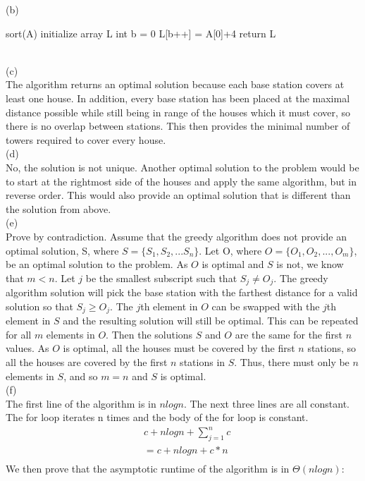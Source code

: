\documentclass{assignment}
\begin{document}
\begin{problemlist}
\begin{answer}
(b)
\begin {algorithm}
sort(A)\;
initialize array L\;
int b = 0\;
L[b++] = A[0]+4\;
return L\;
\end {algorithm}\\
(c)\\
 The algorithm returns an optimal solution because each base station covers at least one house. In addition, every base station has been placed at the maximal distance possible while still being in range of the houses which it must cover, so there is no overlap between stations. This then provides the minimal number of towers required to cover every house.\\
(d)\\
No, the solution is not unique. Another optimal solution to the problem would be to start at the rightmost side of the houses and apply the same algorithm, but in reverse order. This would also provide an optimal solution that is different than the solution from above.\\
(e) \\
Prove by contradiction. Assume that the greedy algorithm does not provide an optimal solution, S, where $S = \{S_1, S_2,...S_n\}$. Let O, where $O = \{O_1, O_2,..., O_m\}$, be an optimal solution to the problem. As $O$ is optimal and $S$ is not, we know that $m < n$. Let $j$ be the smallest subscript such that $S_j \neq O_j$. The greedy algorithm solution will pick the base station with the farthest distance for a valid solution so that $S_j \ge O_j$. The $j$th element in $O$ can be swapped with the $j$th element in $S$ and the resulting solution will still be optimal. This can be repeated for all $m$ elements in $O$. Then the solutions $S$ and $O$ are the same for the first $n$ values. As $O$ is optimal, all the houses must be covered by the first $n$ stations, so all the houses are covered by the first $n$ stations in $S$. Thus, there must only be $n$ elements in $S$, and so $m=n$ and $S$ is optimal.\\
(f) \\
The first line of the algorithm is in $nlogn$. The next three lines are all constant. The for loop iterates n times and the body of the for loop is constant. 
\begin {align*}
&c + nlogn + \sum_{j = 1} ^{n} c\\
&= c + nlogn + c * n\\
\end{align*}
We then prove that the asymptotic runtime of the algorithm is in $\Theta (nlogn)$:\\

\end{answer}
\end{problemlist}
\end{document}
